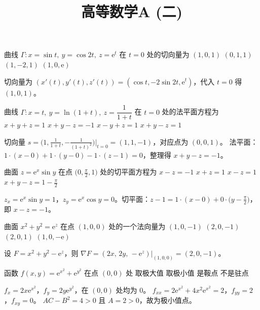 \documentclass[answer]{THUExam}
\title{高等数学A (二)}
\author{}
\begin{document}
\vspace{1cm}
\makehead

\vspace{1cm}


\begin{problem}
曲线 $\Gamma: x=\sin t,\ y=\cos 2t,\ z=\mathrm{e}^t$ 在 $t=0$ 处的切向量为
\options
{$(1,0,1)$}
{$(0,1,1)$}
{$(1,-2,1)$}
{$(1,0,\mathrm{e})$}
\end{problem}
\begin{note}
切向量为 $(x'(t),y'(t),z'(t))=(\cos t,-2\sin 2t,\mathrm{e}^t)$，代入 $t=0$ 得 $(1,0,1)$。
\end{note}
\bigskip

\begin{problem}
曲线 $\Gamma: x=t,\ y=\ln(1+t),\ z=\dfrac{1}{1+t}$ 在 $t=0$ 处的法平面方程为
\options
{$x+y+z=1$}
{$x+y-z=-1$}
{$x-y+z=1$}
{$x+y-z=1$}
\end{problem}
\begin{note}
切向量 $s=\bigl(1,\frac{1}{1+t},-\frac{1}{(1+t)^2}\bigr)\big|_{t=0}=(1,1,-1)$，对应点为 $(0,0,1)$。
法平面：$1\cdot(x-0)+1\cdot(y-0)-1\cdot(z-1)=0$，整理得 $x+y-z=-1$。
\end{note}
\bigskip

\begin{problem}
曲面 $z=\mathrm{e}^{x}\sin y$ 在点 $\bigl(0,\frac{\pi}{2},1\bigr)$ 处的切平面方程为
\options
{$x-z=-1$}
{$x+z=1$}
{$x-z=1$}
{$x+y-z=1-\frac{\pi}{2}$}
\end{problem}
\begin{note}
$z_x=\mathrm{e}^x\sin y=1$，$z_y=\mathrm{e}^x\cos y=0$。切平面：$z-1=1\cdot(x-0)+0\cdot\bigl(y-\frac{\pi}{2}\bigr)$，即 $x-z=-1$。
\end{note}
\bigskip

\begin{problem}
曲面 $x^2+y^2=\mathrm{e}^{z}$ 在点 $(1,0,0)$ 处的一个法向量为
\options
{$(1,0,-1)$}
{$(2,0,-1)$}
{$(2,0,1)$}
{$(1,0,-\mathrm{e})$}
\end{problem}
\begin{note}
设 $F=x^2+y^2-\mathrm{e}^{z}$，则 $\nabla F=(2x,\,2y,\,-\mathrm{e}^{z})\big|_{(1,0,0)}=(2,0,-1)$。
\end{note}
\bigskip

\begin{problem}
函数 $f(x,y)=\mathrm{e}^{x^2}+\mathrm{e}^{y^2}$ 在点 $(0,0)$ 处
\options
{取极大值}
{取极小值}
{是鞍点}
{不是驻点}
\end{problem}
\begin{note}
$f_x=2x\mathrm{e}^{x^2}$，$f_y=2y\mathrm{e}^{y^2}$，在 $(0,0)$ 处均为 $0$。
$f_{xx}=2\mathrm{e}^{x^2}+4x^2\mathrm{e}^{x^2}=2$，$f_{yy}=2$，$f_{xy}=0$。
$AC-B^2=4>0$ 且 $A=2>0$，故为极小值点。
\end{note}
\bigskip
\end{document}
